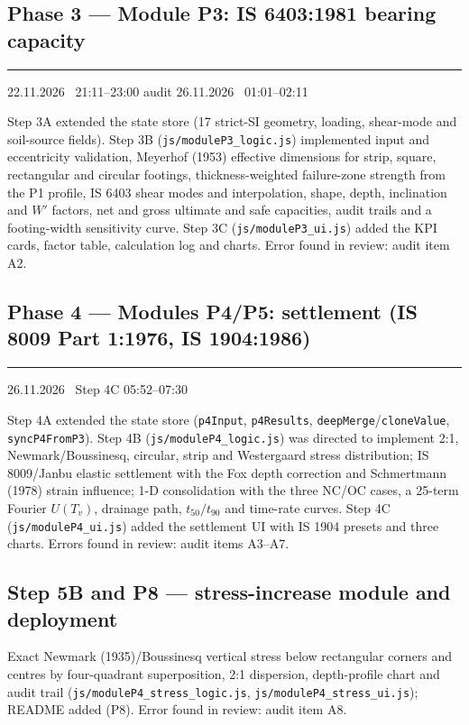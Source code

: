 \documentclass[11pt,a4paper]{article}
\newcommand{\stamp}[1]{{\small\bfseries\color{black!70}\textcolor{accent}{\rule[-2pt]{2pt}{10pt}}\hspace{6pt}#1}\par}
\newcommand{\code}[1]{\texttt{\small #1}}
\begin{document}
\subsection{Phase 3 --- Module P3: IS 6403:1981 bearing capacity}
\stamp{22.11.2026 \textbar\ 21:11--23:00 \quad audit 26.11.2026 \textbar\ 01:01--02:11}
Step 3A extended the state store (17 strict-SI geometry, loading, shear-mode and soil-source fields). Step 3B
(\code{js/moduleP3\_logic.js}) implemented input and eccentricity validation, Meyerhof (1953) effective dimensions for
strip, square, rectangular and circular footings, thickness-weighted failure-zone strength from the P1 profile,
IS 6403 shear modes and interpolation, shape, depth, inclination and $W'$ factors, net and gross ultimate and safe
capacities, audit trails and a footing-width sensitivity curve. Step 3C (\code{js/moduleP3\_ui.js}) added the KPI
cards, factor table, calculation log and charts. Error found in review: audit item A2.

\subsection{Phase 4 --- Modules P4/P5: settlement (IS 8009 Part 1:1976, IS 1904:1986)}
\stamp{26.11.2026 \textbar\ Step 4C 05:52--07:30}
Step 4A extended the state store (\code{p4Input}, \code{p4Results}, \code{deepMerge}/\code{cloneValue},
\code{syncP4FromP3}). Step 4B (\code{js/moduleP4\_logic.js}) was directed to implement 2:1, Newmark/Boussinesq,
circular, strip and Westergaard stress distribution; IS 8009/Janbu elastic settlement with the Fox depth correction
and Schmertmann (1978) strain influence; 1-D consolidation with the three NC/OC cases, a 25-term Fourier $U(T_v)$,
drainage path, $t_{50}/t_{90}$ and time-rate curves. Step 4C (\code{js/moduleP4\_ui.js}) added the settlement UI with
IS 1904 presets and three charts. Errors found in review: audit items A3--A7.

\subsection{Step 5B and P8 --- stress-increase module and deployment}
Exact Newmark (1935)/Boussinesq vertical stress below rectangular corners and centres by four-quadrant superposition,
2:1 dispersion, depth-profile chart and audit trail (\code{js/moduleP4\_stress\_logic.js},
\code{js/moduleP4\_stress\_ui.js}); README added (P8). Error found in review: audit item A8.

\end{document}
